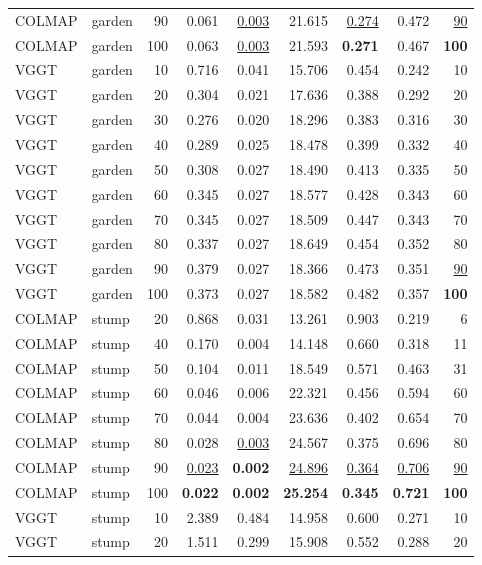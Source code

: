 \begin{table}[H]
\begin{tabular}{llrrrrrrr}
COLMAP & garden & 90 & 0.061 & \underline{0.003} & 21.615 & \underline{0.274} & 0.472 & \underline{90} \\
COLMAP & garden & 100 & 0.063 & \underline{0.003} & 21.593 & \textbf{0.271} & 0.467 & \textbf{100} \\
VGGT & garden & 10 & 0.716 & 0.041 & 15.706 & 0.454 & 0.242 & 10 \\
VGGT & garden & 20 & 0.304 & 0.021 & 17.636 & 0.388 & 0.292 & 20 \\
VGGT & garden & 30 & 0.276 & 0.020 & 18.296 & 0.383 & 0.316 & 30 \\
VGGT & garden & 40 & 0.289 & 0.025 & 18.478 & 0.399 & 0.332 & 40 \\
VGGT & garden & 50 & 0.308 & 0.027 & 18.490 & 0.413 & 0.335 & 50 \\
VGGT & garden & 60 & 0.345 & 0.027 & 18.577 & 0.428 & 0.343 & 60 \\
VGGT & garden & 70 & 0.345 & 0.027 & 18.509 & 0.447 & 0.343 & 70 \\
VGGT & garden & 80 & 0.337 & 0.027 & 18.649 & 0.454 & 0.352 & 80 \\
VGGT & garden & 90 & 0.379 & 0.027 & 18.366 & 0.473 & 0.351 & \underline{90} \\
VGGT & garden & 100 & 0.373 & 0.027 & 18.582 & 0.482 & 0.357 & \textbf{100} \\
\midrule
COLMAP & stump & 20 & 0.868 & 0.031 & 13.261 & 0.903 & 0.219 & 6 \\
COLMAP & stump & 40 & 0.170 & 0.004 & 14.148 & 0.660 & 0.318 & 11 \\
COLMAP & stump & 50 & 0.104 & 0.011 & 18.549 & 0.571 & 0.463 & 31 \\
COLMAP & stump & 60 & 0.046 & 0.006 & 22.321 & 0.456 & 0.594 & 60 \\
COLMAP & stump & 70 & 0.044 & 0.004 & 23.636 & 0.402 & 0.654 & 70 \\
COLMAP & stump & 80 & 0.028 & \underline{0.003} & 24.567 & 0.375 & 0.696 & 80 \\
COLMAP & stump & 90 & \underline{0.023} & \textbf{0.002} & \underline{24.896} & \underline{0.364} & \underline{0.706} & \underline{90} \\
COLMAP & stump & 100 & \textbf{0.022} & \textbf{0.002} & \textbf{25.254} & \textbf{0.345} & \textbf{0.721} & \textbf{100} \\
VGGT & stump & 10 & 2.389 & 0.484 & 14.958 & 0.600 & 0.271 & 10 \\
VGGT & stump & 20 & 1.511 & 0.299 & 15.908 & 0.552 & 0.288 & 20 \\

\end{tabular}
\end{table}
